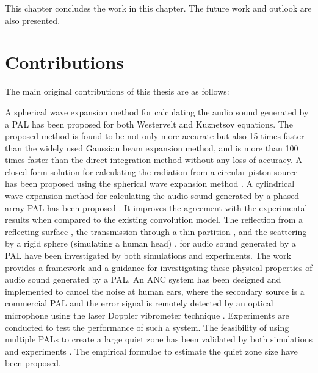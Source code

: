 This chapter concludes the work in this chapter.
The future work and outlook are also presented. 

\section{Contributions}
The main original contributions of this thesis are as follows:
\begin{outline}[enumerate]
    \1 A spherical wave expansion method for calculating the audio sound generated by a PAL has been proposed for both Westervelt \cite{Zhong2020SphericalExpansionAudio} and Kuznetsov \cite{Zhong2021FieldWesterveltFar} equations.
    The proposed method is found to be not only more accurate but also 15 times faster than the widely used Gaussian beam expansion method, and is more than 100 times faster than the direct integration method without any loss of accuracy.
    \1 A closed-form solution for calculating the radiation from a circular piston source has been proposed using the spherical wave expansion method \cite{Zhong2020SphericalExpansionCalculating}.
    \1 A cylindrical wave expansion method for calculating the audio sound generated by a phased array PAL has been proposed \cite{Zhong2021CylindricalExpansionAudio}.
    It improves the agreement with the experimental results when compared to the existing convolution model.
    \1 The reflection from a reflecting surface \cite{Zhong2020ReflectionAudioSounds}, the transmission through a thin partition \cite{Zhong2020InsertionLossThin}, and the scattering by a rigid sphere (simulating a human head) \cite{Zhong2022ScatteringRigidSphere}, for audio sound generated by a PAL have been investigated by both simulations and experiments.
    The work provides a framework and a guidance for investigating these physical properties of audio sound generated by a PAL.
    \1 An ANC system has been designed and implemented to cancel the noise at human ears, where the secondary source is a commercial PAL and the error signal is remotely detected by an optical microphone using the laser Doppler vibrometer technique \cite{Zhong2020ExperimentalStudyActive}.
    Experiments are conducted to test the performance of such a system.
    \1 The feasibility of using multiple PALs to create a large quiet zone has been validated by both simulations and experiments \cite{Zhong2022QuietZoneGeneration}.
    The empirical formulae to estimate the quiet zone size have been proposed.
\end{outline}

